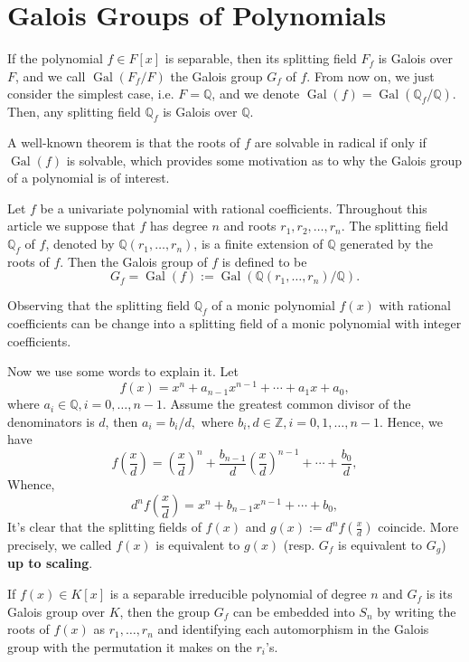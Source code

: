 \section{Galois Groups of Polynomials}
If the polynomial $f\in F[x]$ is separable, then its splitting field $F_f$ is Galois over $F$, and we call $\operatorname{Gal}(F_f/F)$ the Galois group $G_f$ of $f$.
From now on, we just consider the simplest case, i.e. $F=\mathbb{Q}$, and we denote $\operatorname{Gal}(f)=\operatorname{Gal}(\mathbb{Q}_f/\mathbb{Q})$. Then, any splitting field $\mathbb{Q}_f$ is Galois over $\mathbb{Q}$.

A well-known theorem is that the roots of $f$ are solvable in radical if only if $\operatorname{Gal}(f)$ is solvable, which provides some motivation as to why the Galois group of a polynomial is of interest.

Let $f$ be a univariate polynomial with rational coefficients. Throughout this article we suppose that $f$ has degree $n$ and roots $r_1,r_2,\dots,r_n$. The splitting field $\mathbb{Q}_f$ of $f$, denoted by $\mathbb{Q}(r_1,\dots,r_n)$, is a finite extension of $\mathbb{Q}$ generated by the roots of $f$. Then the Galois group of $f$ is
defined to be \[G_f=\operatorname{Gal}(f):=\operatorname{Gal}(\mathbb{Q}(r_1,\dots,r_n)/\mathbb{Q}).\] 

Observing that the splitting field $\mathbb{Q}_f$ of a monic polynomial $f(x)$ with rational coefficients can be change into a splitting field of a monic polynomial with integer coefficients. 

Now we use some words to explain it. Let $$f(x)=x^n+a_{n-1}x^{n-1}+\cdots+a_1 x+a_0,$$ where $a_i\in\mathbb{Q},i=0,\dots,n-1$. Assume the greatest common divisor of the denominators is $d$, then $a_i=b_i/d,$ where $b_i,d\in\mathbb{Z}, i=0,1,\dots,n-1$. Hence, we have 
$$f\left(\frac{x}{d}\right)=\left(\frac{x}{d}\right)^n+\frac{b_{n-1}}{d}\left(\frac{x}{d}\right)^{n-1}+\cdots+\frac{b_0}{d},$$
Whence, $$d^nf\left(\frac{x}{d}\right)=x^n+b_{n-1}x^{n-1}+\cdots+b_0,$$
It's clear that the splitting fields of $f(x)$ and $g(x):=d^nf(\frac{x}{d})$ coincide. More precisely, we called $f(x)$ is equivalent to $g(x)$ (resp. $G_f$ is equivalent to $G_g$) \textbf{up to scaling}.

If $f(x)\in K[x]$ is a separable irreducible polynomial of degree $n$ and $G_f$ is its Galois group over $K$, then the group $G_f$ can be embedded into $S_n$ by writing the roots of $f(x)$ as $r_1,\dots,r_n$ and identifying each automorphism in the Galois group with the permutation it makes on the $r_i$'s. 

